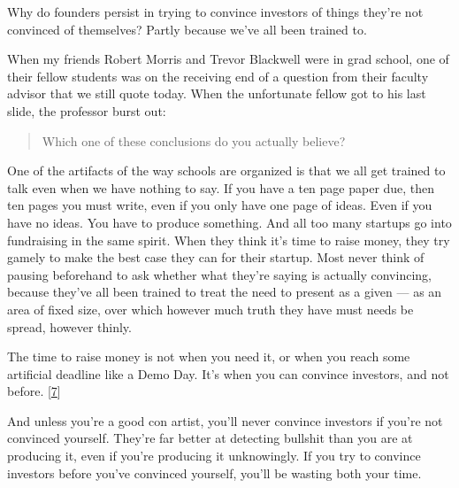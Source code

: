 Why do founders persist in trying to convince
                    investors of things they're not convinced of themselves?
                    Partly because we've all been trained to.

When my
                    friends Robert Morris and Trevor Blackwell were in grad
                    school, one of their fellow students was on the receiving
                    end of a question from their faculty advisor that we still
                    quote today. When the unfortunate fellow got to his last
                    slide, the professor burst out:
                  


                  \begin{quote}

                    Which one of these conclusions do you actually believe?
                  
\end{quote}

                  One of the artifacts of the way schools are organized is that
                  we all get trained to talk even when we have nothing to say.
                  If you have a ten page paper due, then ten pages you must
                  write, even if you only have one page of ideas. Even if you
                  have no ideas. You have to produce something. And all too many
                  startups go into fundraising in the same spirit. When they
                  think it's time to raise money, they try gamely to make the
                  best case they can for their startup. Most never think of
                  pausing beforehand to ask whether what they're saying is
                  actually convincing, because they've all been trained to treat
                  the need to present as a given --- as an area of fixed
                  size, over which however much truth they have must needs be
                  spread, however thinly.

The time to raise money is
                  not when you need it, or when you reach some artificial
                  deadline like a Demo Day. It's when you can convince
                  investors, and not before.
                  [\href{\#f7n}{7}]

And unless you're a good con artist, you'll never
                  convince investors if you're not convinced yourself. They're
                  far better at detecting bullshit than you are at producing it,
                  even if you're producing it unknowingly. If you try to
                  convince investors before you've convinced yourself, you'll be
                  wasting both your time.

